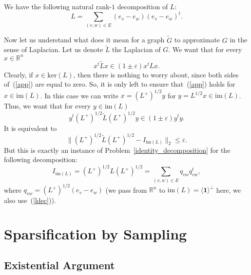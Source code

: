 \documentclass[12pt]{article}
\newcommand{\Rbb}{\mathbb{R}}
\newcommand{\eps}{\varepsilon}
\begin{document}
    We have the following natural rank-$1$ decomposition of $L$:
    \begin{equation}
        \label{ldec}
        L = \sum_{(v, w) \in E} (e_v - e_w) (e_v - e_w)^t.
    \end{equation}

    Now let us understand what does it mean for a graph $\tilde{G}$ to approximate
    $G$ in the sense of Laplacian. Let us denote $\tilde{L}$ the Laplacian of $G$.
    We want that for every $x \in \Rbb^n$
    \begin{equation}
        \label{app}
        x^t \tilde{L} x \in (1 \pm \eps) x^t L x.
    \end{equation}
    Clearly, if $x \in \mathrm{ker}(L)$, then there is nothing to worry about, since
    both sides of~(\ref{app}) are equal to zero. So, it is only left to ensure
    that~(\ref{app}) holds for $x \in \mathrm{im}(L)$.
    In this case we can write $x = (L^+)^{1/2} y$ for
    $y = L^{1/2} x \in \mathrm{im}(L)$.
    Thus, we want that for every $y \in \mathrm{im}(L)$
    $$
        y^t (L^+)^{1/2} \tilde{L} (L^+)^{1/2} y \in (1 \pm \eps) y^t y.
    $$
    It is equivalent to
    $$
        \|(L^+)^{1/2} \tilde{L} (L^+)^{1/2} - I_{\mathrm{im}(L)}\|_2 \leq \eps.
    $$
    But this is exactly an instance of Problem~\ref{identity_decomposition} for
    the following decomposition:
    $$
        I_{\mathrm{im}(L)} = (L^+)^{1/2} L (L^+)^{1/2} = \sum_{(v,w) \in E} q_{vw} q_{vw}^t,
    $$
    where $q_{vw} = (L^+)^{1/2} (e_v - e_w)$ (we pass from $\mathbb{R}^n$ to
    $\mathrm{im}(L) = \langle \mathbf{1} \rangle^{\perp}$ here, we also use~(\ref{ldec})).

    \section{Sparsification by Sampling}
    \label{resistances}

    \subsection{Existential Argument}
\end{document}
